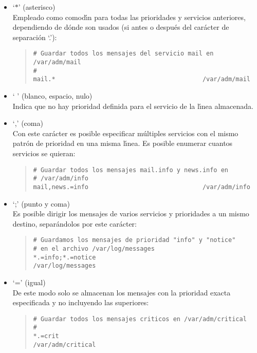 \begin{itemize}
\item{} `$\ast$' (asterisco)\\
Empleado como comod\'{\i}n para todas las prioridades y servicios anteriores, 
dependiendo de d\'onde son usados (si antes o despu\'es del car\'acter de 
separaci\'on `.'):
\begin{quote}
\begin{verbatim}
# Guardar todos los mensajes del servicio mail en /var/adm/mail
#
mail.*                                        /var/adm/mail
\end{verbatim}
\end{quote}
\item{} ` ' (blanco, espacio, nulo)\\
Indica que no hay prioridad definida para el servicio de la l\'{\i}nea
almacenada.
\item{} `,' (coma) \\
Con este car\'acter es posible especificar m\'ultiples servicios con el mismo
patr\'on de prioridad en una misma l\'{\i}nea. Es posible enumerar cuantos
servicios se quieran:
\begin{quote}
\begin{verbatim}
# Guardar todos los mensajes mail.info y news.info en 
# /var/adm/info
mail,news.=info                               /var/adm/info
\end{verbatim}
\end{quote}
\item{} `;' (punto y coma)\\
Es posible dirigir los mensajes de varios servicios y prioridades a un mismo
destino, separ\'andolos por este car\'acter:
\begin{quote}
\begin{verbatim}
# Guardamos los mensajes de prioridad "info" y "notice"
# en el archivo /var/log/messages
*.=info;*.=notice                             /var/log/messages
\end{verbatim}
\end{quote}
\rm
\item{} `=' (igual)\\
De este modo solo se almacenan los mensajes con la prioridad exacta 
especificada y no incluyendo las superiores:
\begin{quote}
\begin{verbatim}
# Guardar todos los mensajes criticos en /var/adm/critical
#
*.=crit                                       /var/adm/critical
\end{verbatim}

\end{quote}
\end{itemize}
